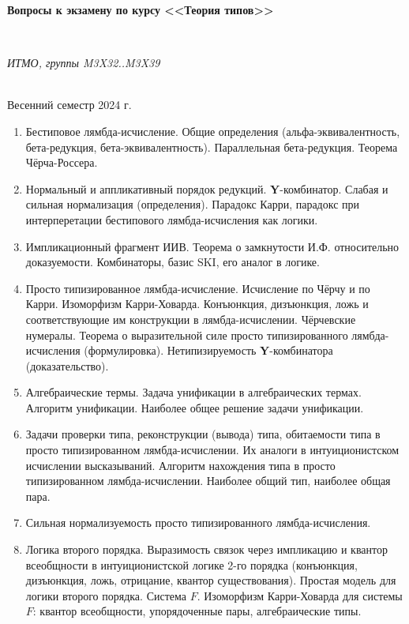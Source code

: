 \documentclass[11pt,a4paper,oneside]{article}
\begin{document}
\begin{center}
\begin{Large}{\bfseries Вопросы к экзамену по курсу <<Теория типов>>}\end{Large}\\
\vspace{1mm}
\begin{small} \itshape ИТМО, группы M3X32..M3X39\end{small}\\
\small Весенний семестр 2024 г.
\end{center}

\begin{enumerate}
\item Бестиповое лямбда-исчисление. Общие определения (альфа-эквивалентность, бета-редукция, бета-эквивалентность).
Параллельная бета-редукция. Теорема Чёрча-Россера.
\item Нормальный и аппликативный порядок редукций. \textbf{Y}-комбинатор. Слабая и сильная нормализация (определения).
Парадокс Карри, парадокс при интерперетации бестипового лямбда-исчисления как логики.
\item Импликационный фрагмент ИИВ. Теорема о замкнутости И.Ф. относительно доказуемости.
Комбинаторы, базис SKI, его аналог в логике.
\item Просто типизированное лямбда-исчисление. Исчисление по Чёрчу и по Карри. Изоморфизм Карри-Ховарда.
Конъюнкция, дизъюнкция, ложь и соответствующие им конструкции в лямбда-исчислении. 
Чёрчевские нумералы. Теорема о выразительной силе просто типизированного лямбда-исчисления (формулировка).
Нетипизируемость \textbf{Y}-комбинатора (доказательство).
\item Алгебраические термы. Задача унификации в алгебраических термах. Алгоритм унификации. Наиболее общее решение задачи унификации.
\item Задачи проверки типа, реконструкции (вывода) типа, обитаемости типа в просто типизированном лямбда-исчислении.
Их аналоги в интуиционистском исчислении высказываний. 
Алгоритм нахождения типа в просто типизированном лямбда-исчислении. Наиболее общий тип, наиболее общая пара.
\item Сильная нормализуемость просто типизированного лямбда-исчисления.
\item Логика второго порядка. Выразимость связок через импликацию и квантор всеобщности в интуиционистской логике 
2-го порядка (конъюнкция, дизъюнкция, ложь, отрицание, квантор существования). Простая модель для логики второго порядка.
Система $F$. Изоморфизм Карри-Ховарда для системы $F$: квантор всеобщности, упорядоченные пары, алгебраические типы.

\end{enumerate}
\end{document}

